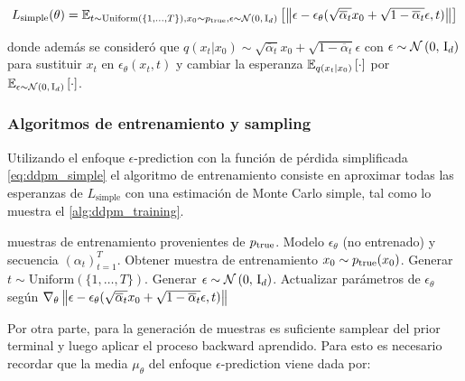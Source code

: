 \begin{equation}
    \label{eq:ddpm_simple}
    L_{\text{simple}}(\theta) = \mathbb{E}_{t\sim\text{Uniform}\left(\{1,\ldots,T\}\right),x_0\sim p_{\operatorname{true}},\epsilon\sim\mathcal{N}\left(0,\,\operatorname{I}_{d}\right)}\left[\left\lVert \epsilon-\epsilon_\theta(\sqrt{\overline{\alpha}_t}x_0+\sqrt{1-\overline{\alpha}_t}\epsilon,t) \right\rVert\right]
\end{equation}

donde además se consideró que $q(x_t|x_0)\sim \sqrt{\overline{\alpha}_t}x_0 + \sqrt{1-\overline{\alpha}_t}\epsilon$ con $\epsilon\sim\mathcal{N}\left(0,\,\operatorname{I}_{d}\right)$ para sustituir $x_t$ en $\epsilon_\theta(x_t,t)$ y cambiar la esperanza $\mathbb{E}_{q(x_t|x_0)}\left[\cdot\right]$ por $\mathbb{E}_{\epsilon\sim\mathcal{N}\left(0,\,\operatorname{I}_{d}\right)}\left[\cdot\right]$.

\subsubsection{Algoritmos de entrenamiento y sampling}

Utilizando el enfoque $\epsilon$-prediction con la función de pérdida simplificada \eqref{eq:ddpm_simple} el algoritmo de entrenamiento consiste en aproximar todas las esperanzas de $L_\text{simple}$ con una estimación de Monte Carlo simple, tal como lo muestra el \autoref{alg:ddpm_training}.

\begin{algorithm}
    \caption{Entrenamiento del modelo DDPM}
    \label{alg:ddpm_training}
    \begin{algorithmic}[1]
        \Require muestras de entrenamiento provenientes de $p_{\operatorname{true}}$.
        \Require Modelo $\epsilon_\theta$ (no entrenado) y secuencia $(\alpha_t)_{t=1}^T$.
        \State Obtener muestra de entrenamiento $x_0\sim p_{\operatorname{true}}(x_0)$.
        \State Generar $t\sim\text{Uniform}\left(\{1,\ldots,T\}\right)$.
        \State Generar $\epsilon\sim\mathcal{N}\left(0,\,\operatorname{I}_{d}\right)$.
        \State Actualizar parámetros de $\epsilon_\theta$ según $\nabla_\theta \left\lVert \epsilon-\epsilon_\theta(\sqrt{\overline{\alpha}_t}x_0+\sqrt{1-\overline{\alpha}_t}\epsilon,t) \right\rVert$
        \EndWhile
    \end{algorithmic}
\end{algorithm}

Por otra parte, para la generación de muestras es suficiente samplear del prior terminal y luego aplicar el proceso backward aprendido. Para esto es necesario recordar que la media $\mu_\theta$ del enfoque $\epsilon$-prediction viene dada por:

